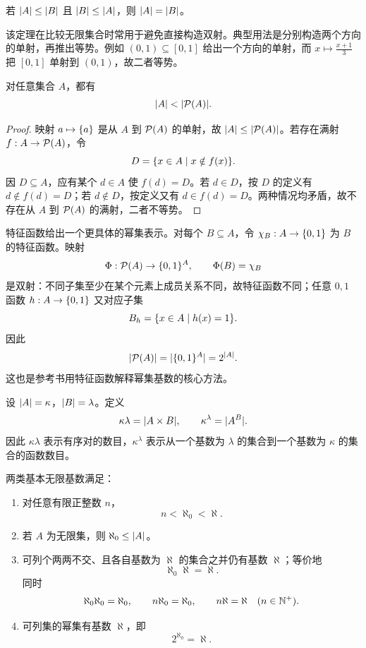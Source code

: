 \begin{theorem}\label{sb-theorem}
  若 $\lvert A\rvert\le\lvert B\rvert$ 且 $\lvert B\rvert\le\lvert A\rvert$，则 $\lvert A\rvert=\lvert B\rvert$。
\end{theorem}

该定理在比较无限集合时常用于避免直接构造双射。典型用法是分别构造两个方向的单射，再推出等势。例如 $(0,1)\subseteq[0,1]$ 给出一个方向的单射，而 $x\mapsto \frac{x+1}{3}$ 把 $[0,1]$ 单射到 $(0,1)$，故二者等势。

\begin{theorem}[幂集严格变大]\label{cantor-power-set}
  对任意集合 $A$，都有
  \[
  \lvert A\rvert<\lvert\mathcal P(A)\rvert.
  \]
\end{theorem}

\begin{proof}
  映射 $a\mapsto\{a\}$ 是从 $A$ 到 $\mathcal P(A)$ 的单射，故 $\lvert A\rvert\le\lvert\mathcal P(A)\rvert$。若存在满射 $f:A\to\mathcal P(A)$，令
  \[
  D=\{x\in A\mid x\notin f(x)\}.
  \]
  因 $D\subseteq A$，应有某个 $d\in A$ 使 $f(d)=D$。若 $d\in D$，按 $D$ 的定义有 $d\notin f(d)=D$；若 $d\notin D$，按定义又有 $d\in f(d)=D$。两种情况均矛盾，故不存在从 $A$ 到 $\mathcal P(A)$ 的满射，二者不等势。
\end{proof}

特征函数给出一个更具体的幂集表示。对每个 $B\subseteq A$，令 $\chi_B:A\to\{0,1\}$ 为 $B$ 的特征函数。映射
\[
\Phi:\mathcal P(A)\to\{0,1\}^A,\qquad \Phi(B)=\chi_B
\]
是双射：不同子集至少在某个元素上成员关系不同，故特征函数不同；任意 $0,1$ 函数 $h:A\to\{0,1\}$ 又对应子集
\[
B_h=\{x\in A\mid h(x)=1\}.
\]
因此
\[
\lvert\mathcal P(A)\rvert=\lvert\{0,1\}^A\rvert=2^{\lvert A\rvert}.
\]
这也是参考书用特征函数解释幂集基数的核心方法。

\begin{definition}[基数的乘法与幂]\label{cardinal-product-power}
  设 $\lvert A\rvert=\kappa$，$\lvert B\rvert=\lambda$。定义
  \[
  \kappa\lambda=\lvert A\times B\rvert,\qquad
  \kappa^\lambda=\lvert A^B\rvert.
  \]
  因此 $\kappa\lambda$ 表示有序对的数目，$\kappa^\lambda$ 表示从一个基数为 $\lambda$ 的集合到一个基数为 $\kappa$ 的集合的函数数目。
\end{definition}

\begin{theorem}\label{aleph-properties}
  两类基本无限基数满足：
  \begin{enumerate}
    \item 对任意有限正整数 $n$，
    \[
    n<\aleph_0<\aleph.
    \]
    \item 若 $A$ 为无限集，则 $\aleph_0\le\lvert A\rvert$。
    \item 可列个两两不交、且各自基数为 $\aleph$ 的集合之并仍有基数 $\aleph$；等价地
    \[
    \aleph_0\aleph=\aleph.
    \]
    同时
    \[
    \aleph_0\aleph_0=\aleph_0,\qquad
    n\aleph_0=\aleph_0,\qquad
    n\aleph=\aleph\quad(n\in\mathbb{N}^+).
    \]
    \item 可列集的幂集有基数 $\aleph$，即
    \[
    2^{\aleph_0}=\aleph.
    \]
  \end{enumerate}
\end{theorem}

